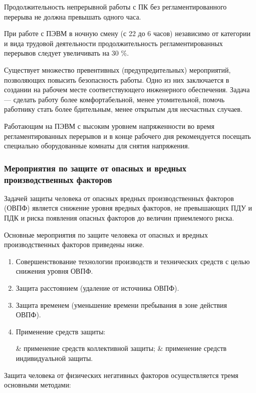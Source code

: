 Продолжительность непрерывной работы с ПК без регламентированного перерыва не должна превышать одного часа.

При работе с ПЭВМ в ночную смену (с 22 до 6 часов) независимо от категории и вида трудовой деятельности продолжительность регламентированных перерывов следует увеличивать на 30 \%.

Существует множество превентивных (предупредительных) мероприятий, позволяющих повысить безопасность работы.
Одно из них заключается в создании на рабочем месте соответствующего инженерного обеспечения.
Задача --- сделать работу более комфортабельной, менее утомительной, помочь работнику стать более бдительным, менее открытым для несчастных случаев.

Работающим на ПЭВМ с высоким уровнем напряженности во время регламентированных перерывов и в конце рабочего дня рекомендуется посещать специально оборудованные комнаты для снятия напряжения.

\subsubsection{Мероприятия по защите от опасных и вредных производственных факторов}

Задачей защиты человека от опасных вредных производственных факторов (ОВПФ) является снижение уровня вредных факторов, не превышающих ПДУ и ПДК и риска появления опасных факторов до величин приемлемого риска.

Основные мероприятия по защите человека от опасных и вредных производственных факторов приведены ниже.

\begin{enumerate}[1.]
	\item Совершенствование технологии производств и технических средств с целью снижения уровня ОВПФ.
	\item Защита расстоянием (удаление от источника ОВПФ).
	\item Защита временем (уменьшение времени пребывания в зоне действия \\ ОВПФ).
	\item Применение средств защиты:
	\begin{easylist}
	& применение средств коллективной защиты;
	& применение средств индивидуальной защиты.
	\end{easylist}
\end{enumerate}

Защита человека от физических негативных факторов осуществляется тремя основными методами:

